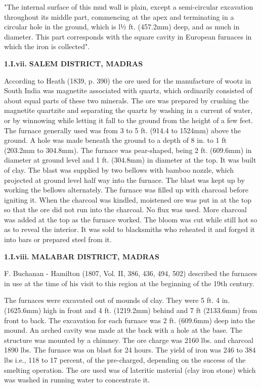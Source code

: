 "The internal surface of this mud wall is plain, except a semi-circular excavation throughout its middle part, commencing at the apex and terminating in a circular hole in the ground, which is l½ ft. (457.2mm) deep, and as much in diameter. This part corresponds with the square cavity in European furnaces in which the iron is collected".

\textbf{1.I.vii.}\textbf{ SALEM DISTRICT, MADRAS}

According to Heath (1839, p. 390) the ore used for the manufacture of wootz in South India was magnetite associated with quartz, which ordinarily consisted of about equal parts of these two minerals. The ore was prepared by crushing the magnetite quartzite and separating the quartz by washing in a current of water, or by winnowing while letting it fall to the ground from the height of a few feet. The furnace generally used was from 3 to 5 ft. (914.4 to 1524mm) above the ground. A hole was made beneath the ground to a depth of 8 in. to 1 ft (203.2mm to 304.8mm). The furnace was pear-shaped, being 2 ft. (609.6mm) in diameter at ground level and 1 ft. (304.8mm) in diameter at the top. It was built of clay. The blast was supplied by two bellows with bamboo nozzle, which projected at ground level half way into the furnace. The blast was kept up by working the bellows alternately. The furnace was filled up with charcoal before igniting it. When the charcoal was kindled, moistened ore was put in at the top so that the ore did not run into the charcoal. No flux was used. More charcoal was added at the top as the furnace worked. The bloom was cut while still hot so as to reveal the interior. It was sold to blacksmiths who reheated it and forged it into bars or prepared steel from it.

\textbf{1.I.viii.}\textbf{ MALABAR DISTRICT, MADRAS}

F. Buchanan - Hamilton (1807, Vol. II, 386, 436, 494, 502) described the furnaces in use at the time of his visit to this region at the beginning of the 19th century.

The furnaces were excavated out of mounds of clay. They were 5 ft. 4 in. (1625.6mm) high in front and 4 ft. (1219.2mm) behind and 7 ft (2133.6mm) from front to back. The excavation for each furnace was 2 ft. (609.6mm) deep into the mound. An arched cavity was made at the back with a hole at the base. The structure was mounted by a chimney. The ore charge was 2160 lbs. and charcoal 1890 lbs. The furnace was on blast for 24 hours. The yield of iron was 246 to 384 lbs i.e., 118 to 17 percent, of the pre-charged, depending on the success of the smelting operation. The ore used was of lateritic material (clay iron stone) which was washed in running water to concentrate it.

